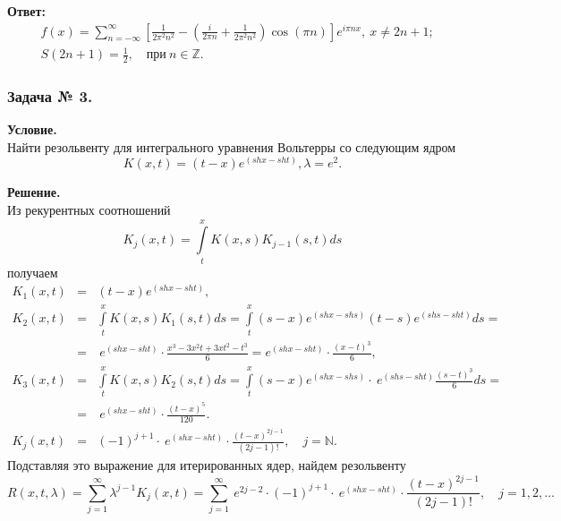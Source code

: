\noindent
\textbf{Ответ:}
\[
\begin{split}
&f(x)=\sum_{n=-\infty}^\infty\left[ \frac{1}{2\pi^2 n^2}-\left(\frac{i}{2 \pi n}+\frac{1}{2\pi^2 n^2}\right)\cos\left(\pi n\right)\right] e^{i\pi nx},~ x\ne 2n+1; \\
&S(2n+1)=\frac{1}{2},\quad\text{при}~n\in\mathbb{Z}.
\end{split}
\]


\subsubsection*{\center Задача № 3.}
{\bf Условие.~}\\
Найти резольвенту для интегрального уравнения Вольтерры со следующим ядром 
$$K(x,t)=(t-x)e^{\left(shx-sht\right)},\lambda=e^2.$$

\noindent
{\bf Решение.~}\\
\noindent
Из рекурентных соотношений 
$$K_j(x,t)=\displaystyle\int\limits_t^x K(x,s)K_{j-1}(s,t)ds$$ получаем
$$
\begin{array}{rcl}
K_1(x,t)&=&\displaystyle (t-x)e^{\left(shx-sht\right)}, \\[12pt]
K_2(x,t)&=&\displaystyle\int\limits_t^x K(x,s)K_1(s,t)ds = \int\limits_t^x (s-x)e^{\left(shx-shs\right)}(t-s)e^{\left(shs-sht\right)} ds = \\[12pt]
&=&\displaystyle\ e^{\left(shx-sht\right)}\cdot\frac{x^3-3x^2t+3xt^2-t^3}{6}=e^{\left(shx-sht\right)}\cdot\frac{(x-t)^3}{6},
\\[12pt]
K_3(x,t)&=&\displaystyle\int\limits_t^x K(x,s)K_2(s,t)ds = \int\limits_t^x (s-x)e^{\left(shx-shs\right)}\cdot\ e^{\left(shs-sht\right)}\frac{(s-t)^3}{6}ds =  \\[12pt]
&=&\displaystyle\ e^{\left(shx-sht\right)}\cdot\frac{(t-x)^5}{120} . \\[12pt]
K_j(x,t)&=&\displaystyle\left(-1\right)^{j+1}\cdot\ e^{\left(shx-sht\right)}\cdot\frac{(t-x)^{2j-1}}{(2j-1)!},\quad j=\mathbb{N}.
\end{array}
$$
Подставляя это выражение для итерированных ядер, найдем резольвенту
$$ 
R(x,t,\lambda)=\sum_{j=1}^\infty \lambda^{j-1}K_j(x,t)=\sum_{j=1}^\infty\ e^{2j-2}\cdot\left(-1\right)^{j+1}\cdot\ e^{\left(shx-sht\right)}\cdot\frac{(t-x)^{2j-1}}{(2j-1)!},
\quad j=1,2,\ldots
$$
